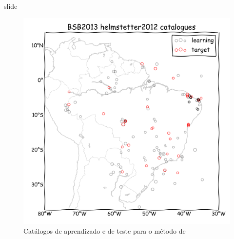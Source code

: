 \documentclass[ucs,8pt]{beamer}
\begin{document}
\begin{frame}{slide}


\begin{figure}[H]
  \centering
  \includegraphics[height=.80\textheight]{helmstetter_catalogues} 
  \caption{Catálogos de aprendizado e de teste para o método de \citet{helmstetter_2012}}
  \label{fig:h_catalogue} 
\end{figure}


\end{frame}
\end{document}

